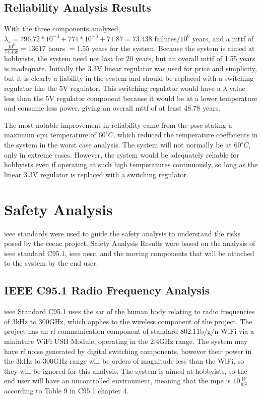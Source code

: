 \subsection{Reliability Analysis Results}
With the three components analyzed, $\lambda_s=796.72*10^{-3}+771*10^{-3}+71.87=73.438$ failures$/10^6$ years, and a \gls{mttf} of $\frac{10^6}{73.438}=13617$ hours $=1.55$ years for the system.
Because the system is aimed at hobbyists, the system need not last for 20 years, but an overall \gls{mttf} of 1.55 years is inadequate.
Initially the 3.3V linear regulator was used for price and simplicity, but it is clearly a liability in the system and should be replaced with a switching regulator like the 5V regulator.
This switching regulator would have a $\lambda$ value less than the 5V regulator component because it would be at a lower temperature and consume less power, giving an overall \gls{mttf} of at least 48.78 years.

The most notable improvement in reliability came from the \gls{pssc} stating a maximum \gls{cpu} temperature of $60^{\circ}C$, which reduced the temperature coefficients in the system in the worst case analysis.
The system will not normally be at $60^{\circ}C$, only in extreme cases.
However, the system would be adequately reliable for hobbyists even if operating at such high temperatures continuously, so long as the linear 3.3V regulator is replaced with a switching regulator.

\section{Safety Analysis}
\gls{ieee} standards were used to guide the safety analysis to understand the risks posed by the \gls{ceenc} project.
Safety Analysis Results were based on the analysis of \gls{ieee} standard C95.1\cite{ieeec951}, \gls{ieee} \gls{nesc}\cite{ieeenesc}, and the moving components that will be attached to the system by the end user. 

\subsection{IEEE C95.1 Radio Frequency Analysis}
\gls{ieee} Standard C95.1\cite{ieeec951} uses the \gls{sar} of the human body relating to radio frequencies of 3kHz to 300GHz, which applies to the wireless component of the project.
The project has an \gls{rf} communication component of standard 802.11b/g/n WiFi via a miniature WiFi USB Module, operating in the 2.4GHz range.
The system may have \gls{rf} noise generated by digital switching components, however their power in the 3kHz to 300GHz range will be orders of magnitude less than the WiFi, so they will be ignored for this analysis.
The system is aimed at hobbyists, so the end user will have an uncontrolled environment, meaning that the \gls{mpe} is $10\frac{W}{m^2}$ according to Table 9 in C95.1 chapter 4\cite{ieeec951}.

